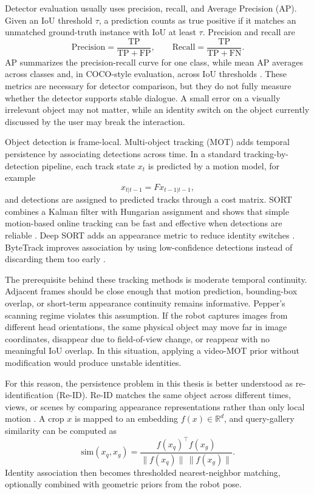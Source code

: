 Detector evaluation usually uses precision, recall, and Average Precision (AP). Given an IoU threshold \(\tau\), a prediction counts as true positive if it matches an unmatched ground-truth instance with IoU at least \(\tau\). Precision and recall are
\[
\mathrm{Precision}=\frac{\mathrm{TP}}{\mathrm{TP}+\mathrm{FP}},\qquad
\mathrm{Recall}=\frac{\mathrm{TP}}{\mathrm{TP}+\mathrm{FN}}.
\]
AP summarizes the precision-recall curve for one class, while mean AP averages across classes and, in COCO-style evaluation, across IoU thresholds \cite{foundationsCVbook}. These metrics are necessary for detector comparison, but they do not fully measure whether the detector supports stable dialogue. A small error on a visually irrelevant object may not matter, while an identity switch on the object currently discussed by the user may break the interaction.

Object detection is frame-local. Multi-object tracking (MOT) adds temporal persistence by associating detections across time. In a standard tracking-by-detection pipeline, each track state \(x_t\) is predicted by a motion model, for example
\[
x_{t|t-1}=F x_{t-1|t-1},
\]
and detections are assigned to predicted tracks through a cost matrix. SORT combines a Kalman filter with Hungarian assignment and shows that simple motion-based online tracking can be fast and effective when detections are reliable \cite{bewley_simple_2016}. Deep SORT adds an appearance metric to reduce identity switches \cite{wojke_simple_2017}. ByteTrack improves association by using low-confidence detections instead of discarding them too early \cite{zhang_bytetrack_2022}.

The prerequisite behind these tracking methods is moderate temporal continuity. Adjacent frames should be close enough that motion prediction, bounding-box overlap, or short-term appearance continuity remains informative. Pepper's scanning regime violates this assumption. If the robot captures images from different head orientations, the same physical object may move far in image coordinates, disappear due to field-of-view change, or reappear with no meaningful IoU overlap. In this situation, applying a video-MOT prior without modification would produce unstable identities.

For this reason, the persistence problem in this thesis is better understood as re-identification (Re-ID). Re-ID matches the same object across different times, views, or scenes by comparing appearance representations rather than only local motion \cite{ye_transformer_2024}. A crop \(x\) is mapped to an embedding \(f(x)\in\mathbb{R}^d\), and query-gallery similarity can be computed as
\[
\mathrm{sim}(x_q,x_g)=\frac{f(x_q)^\top f(x_g)}{\|f(x_q)\|\,\|f(x_g)\|}.
\]
Identity association then becomes thresholded nearest-neighbor matching, optionally combined with geometric priors from the robot pose.

